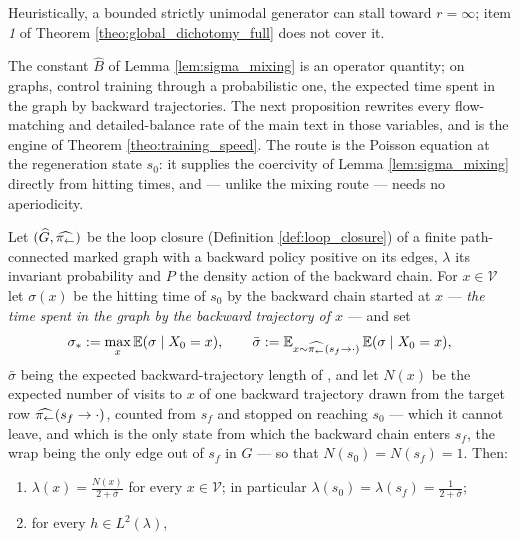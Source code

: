 Heuristically, a bounded strictly unimodal generator can stall toward $r=\infty$; item \emph{1} of Theorem \ref{theo:global_dichotomy_full} does not cover it.

The constant $\widehat B$ of Lemma \ref{lem:sigma_mixing} is an operator quantity; on graphs, \citet{morozov2025revisiting} control training through a probabilistic one, the expected time spent in the graph by backward trajectories. The next proposition rewrites every flow-matching and detailed-balance rate of the main text in those variables, and is the engine of Theorem \ref{theo:training_speed}. The route is the Poisson equation at the regeneration state $s_0$: it supplies the coercivity of Lemma \ref{lem:sigma_mixing} directly from hitting times, and --- unlike the mixing route --- needs no aperiodicity.

\begin{proposition}\label{prop:morozov_rate}
Let $(\widehat G,\widehat{\pi_{\leftarrow}})$ be the loop closure (Definition \ref{def:loop_closure}) of a finite path-connected marked graph with a backward policy positive on its edges, $\lambda$ its invariant probability and $P$ the density action of the backward chain. For $x\in\mathcal V$ let $\sigma(x)$ be the hitting time of $s_0$ by the backward chain started at $x$ --- \emph{the time spent in the graph by the backward trajectory of $x$} --- and set
\begin{equation*}
    \sigma_*:=\max_{x}\mathbb E(\sigma\mid X_0=x),\qquad
    \bar\sigma:=\mathbb E_{x\sim\widehat{\pi_{\leftarrow}}(s_f\rightarrow\cdot)}\,\mathbb E(\sigma\mid X_0=x),
\end{equation*}
$\bar\sigma$ being the expected backward-trajectory length of \citet{morozov2025revisiting}, and let $N(x)$ be the expected number of visits to $x$ of one backward trajectory drawn from the target row $\widehat{\pi_{\leftarrow}}(s_f\rightarrow\cdot)$, counted from $s_f$ and stopped on reaching $s_0$ --- which it cannot leave, and which is the only state from which the backward chain enters $s_f$, the wrap being the only edge out of $s_f$ in $\widehat G$ --- so that $N(s_0)=N(s_f)=1$. Then:
\begin{enumerate}
    \item $\displaystyle\lambda(x)=\frac{N(x)}{2+\bar\sigma}$ for every $x\in\mathcal V$; in particular $\lambda(s_0)=\lambda(s_f)=\frac1{2+\bar\sigma}$;
    \item for every $h\in L^2(\lambda)$,
    \begin{equation*}

\end{equation*}
\end{enumerate}
\end{proposition}

